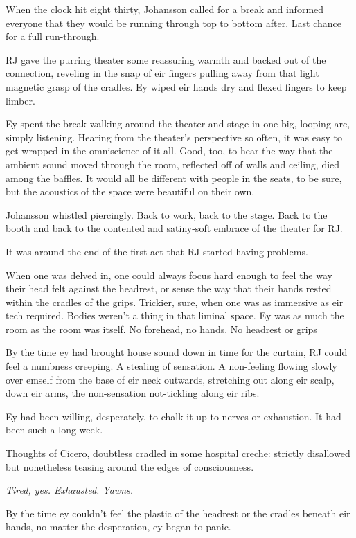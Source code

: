 When the clock hit eight thirty, Johansson called for a break and informed everyone that they would be running through top to bottom after. Last chance for a full run-through.

RJ gave the purring theater some reassuring warmth and backed out of the connection, reveling in the snap of eir fingers pulling away from that light magnetic grasp of the cradles. Ey wiped eir hands dry and flexed fingers to keep limber.

Ey spent the break walking around the theater and stage in one big, looping arc, simply listening. Hearing from the theater's perspective so often, it was easy to get wrapped in the omniscience of it all. Good, too, to hear the way that the ambient sound moved through the room, reflected off of walls and ceiling, died among the baffles. It would all be different with people in the seats, to be sure, but the acoustics of the space were beautiful on their own.

Johansson whistled piercingly. Back to work, back to the stage. Back to the booth and back to the contented and satiny-soft embrace of the theater for RJ.

It was around the end of the first act that RJ started having problems.

When one was delved in, one could always focus hard enough to feel the way their head felt against the headrest, or sense the way that their hands rested within the cradles of the grips. Trickier, sure, when one was as immersive as eir tech required. Bodies weren't a thing in that liminal space. Ey was as much the room as the room was itself. No forehead, no hands. No headrest or grips

By the time ey had brought house sound down in time for the curtain, RJ could feel a numbness creeping. A stealing of sensation. A non-feeling flowing slowly over emself from the base of eir neck outwards, stretching out along eir scalp, down eir arms, the non-sensation not-tickling along eir ribs.

Ey had been willing, desperately, to chalk it up to nerves or exhaustion. It had been such a long week.

Thoughts of Cicero, doubtless cradled in some hospital creche: strictly disallowed but nonetheless teasing around the edges of consciousness.

\emph{Tired, yes. Exhausted. Yawns.}

By the time ey couldn't feel the plastic of the headrest or the cradles beneath eir hands, no matter the desperation, ey began to panic.

